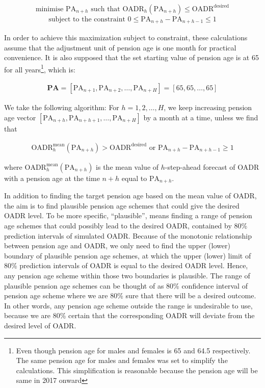 \documentclass[11pt,a4paper,]{article}
\begin{document}
\begin{equation}
  \text{minimise~} \text{PA}_{n+h}  \text{~such that~} \text{OADR}_h(\text{PA}_{n+h})\leq \text{OADR}^{\text{desired}}
\end{equation}\begin{align*}
  \text{subject to the constraint~} 0\leq \text{PA}_{n+h}-\text{PA}_{n+h-1}\leq 1
\end{align*}

In order to achieve this maximization subject to constraint, these
calculations assume that the adjustment unit of pension age is one month
for practical convenience. It is also supposed that the set starting
value of pension age is at 65 for all
years\footnote{Even though pension age for males and females is 65 and 64.5 respectively. The same pension age for males and females was set to simplify the calculations. This simplification is reasonable because the pension age will be same in 2017 onward},
which is:

\begin{align*}
  \bm{\text{PA}}=\left[\text{PA}_{n+1},\text{PA}_{n+2},\dots,\text{PA}_{n+H}\right] = \left[65,65,\dots,65\right]
\end{align*}

We take the following algorithm: For \(h=1,2,\dots,H\), we keep
increasing pension age vector
\([\text{PA}_{n+h},\text{PA}_{n+h+1},\dots,\text{PA}_{n+H}]\) by a month
at a time, unless we find that

\begin{align}
  \text{OADR}^{\text{mean}}_h(\text{PA}_{n+h})> \text{OADR}^{\text{desired}} \text{~or~} \text{PA}_{n+h}-\text{PA}_{n+h-1}\geq 1
\end{align}

where \(\text{OADR}^{\text{mean}}_h(\text{PA}_{n+h})\) is the mean value
of \(h\)-step-ahead forecast of OADR with a pension age at the time
\(n+h\) equal to \(\text{PA}_{n+h}\).

In addition to finding the target pension age based on the mean value of
OADR, the aim is to find plausible pension age schemes that could give
the desired OADR level. To be more specific, ``plausible'', means
finding a range of pension age schemes that could possibly lead to the
desired OADR, contained by 80\% prediction intervals of simulated OADR.
Because of the monotonic relationship between pension age and OADR, we
only need to find the upper (lower) boundary of plausible pension age
schemes, at which the upper (lower) limit of 80\% prediction intervals
of OADR is equal to the desired OADR level. Hence, any pension age
scheme within those two boundaries is plausible. The range of plausible
pension age schemes can be thought of as 80\% confidence interval of
pension age scheme where we are 80\% sure that there will be a desired
outcome. In other words, any pension age scheme outside the range is
undesirable to use, because we are 80\% certain that the corresponding
OADR will deviate from the desired level of OADR.
\end{document}
